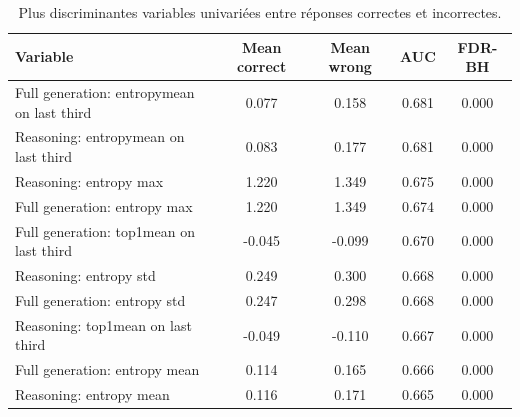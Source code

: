 \begin{table}[htbp]
\centering
\caption{Plus discriminantes variables univariées entre réponses correctes et incorrectes.}
\label{tab:logprob_top_univariate}
\begin{tabular}{lcccc}
\toprule
Variable & Mean correct & Mean wrong & AUC & FDR-BH \\
\midrule
Full generation: entropymean on last third & 0.077 & 0.158 & 0.681 & 0.000 \\
Reasoning: entropymean on last third & 0.083 & 0.177 & 0.681 & 0.000 \\
Reasoning: entropy max & 1.220 & 1.349 & 0.675 & 0.000 \\
Full generation: entropy max & 1.220 & 1.349 & 0.674 & 0.000 \\
Full generation: top1mean on last third & -0.045 & -0.099 & 0.670 & 0.000 \\
Reasoning: entropy std & 0.249 & 0.300 & 0.668 & 0.000 \\
Full generation: entropy std & 0.247 & 0.298 & 0.668 & 0.000 \\
Reasoning: top1mean on last third & -0.049 & -0.110 & 0.667 & 0.000 \\
Full generation: entropy mean & 0.114 & 0.165 & 0.666 & 0.000 \\
Reasoning: entropy mean & 0.116 & 0.171 & 0.665 & 0.000 \\
\bottomrule
\end{tabular}

\end{table}
